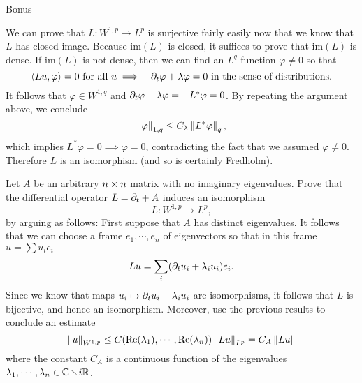 \documentclass{amsart}
\begin{document}
\begin{clear}{Bonus}
\begin{xca}
  We can prove that $L:W^{1,p}\to L^{p}$ is surjective fairly easily now that we know
  that $L$ has closed image. Because $\text{im}(L)$ is closed, it
  suffices to prove that $\text{im}(L)$ is dense. If $\text{im}(L)$ is
  not dense, then we can find an $L^{q}$ function $\varphi\ne 0$ so that
  \begin{equation*}
    \left\langle Lu,\varphi\right\rangle=0\text{ for all $u$}\implies
    -\partial_{t}\varphi+\lambda \varphi=0\text{ in the sense of distributions}. 
  \end{equation*}
  It follows that $\varphi\in W^{1,q}$ and
  $\partial_{t}\varphi-\lambda\varphi=-L^{*}\varphi=0$. By repeating the
  argument above, we conclude
  \begin{equation*}
    \left\lVert\varphi\right\rVert_{1,q}\le C_{\lambda}\left\lVert L^{*}\varphi\right\rVert_{q},
  \end{equation*}
  which implies $L^{*}\varphi=0\implies \varphi=0$, contradicting the
  fact that we assumed $\varphi\ne 0$. Therefore $L$ is an
  isomorphism (and so is certainly Fredholm). 
\end{xca}
\begin{xca}
  Let $A$ be an arbitrary $n\times n$ matrix with no imaginary
  eigenvalues. Prove that the differential operator $L=\partial_{t}+A$
  induces an isomorphism
  \begin{equation*}
    L:W^{1,p}\to L^{p},
  \end{equation*}
  by arguing as follows: First suppose that $A$ has distinct
  eigenvalues. It follows that we can choose a frame
  $e_{1},\cdots,e_{n}$ of eigenvectors so that in this frame $u=\sum u_{i}e_{i}$
  \begin{equation*}
    Lu=\sum_{i}(\partial_{t}u_{i}+\lambda_{i}u_{i})e_{i}.
  \end{equation*}
  Since we know that maps $u_{i}\mapsto \partial_{t}u_{i}+\lambda_{i}u_{i}$ are
  isomorphisms, it follows that $L$ is bijective, and hence an
  isomorphism. Moreover, use the previous results to conclude an estimate
  \begin{equation*}
    \left\lVert u\right\rVert_{W^{1,p}}\le
    C(\text{Re}(\lambda_{1}),\cdots,\text{Re}(\lambda_{n}))\left\lVert Lu\right\rVert_{L^{p}}=C_{A}\left\lVert Lu\right\rVert
  \end{equation*}
  where the constant $C_{A}$ is a continuous function of the eigenvalues
  $\lambda_{1},\cdots,\lambda_{n}\in \C\setminus i\R$.


\end{xca}
\end{clear}
\end{document}
